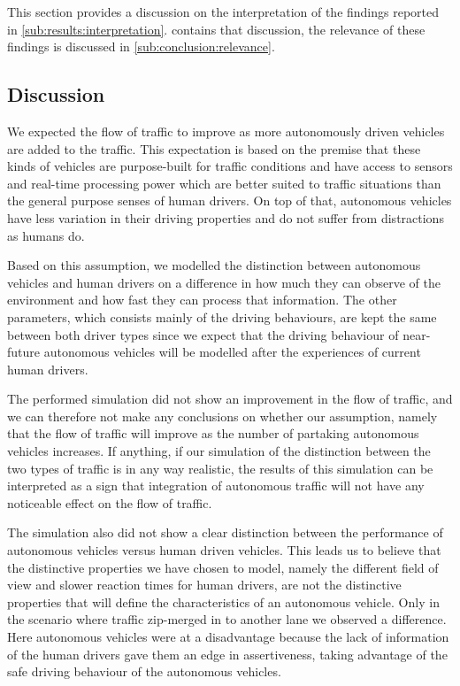 
This section provides a discussion on the interpretation of the findings reported in \cref{sub:results:interpretation}.  contains that discussion, the relevance of these findings is discussed in \cref{sub:conclusion:relevance}.

\subsection{Discussion}
\label{sub:conclusion:discussion}
We expected the flow of traffic to improve as more autonomously driven vehicles are added to the traffic. This expectation is based on the premise that these kinds of vehicles are purpose-built for traffic conditions and have access to sensors and real-time processing power which are better suited to traffic situations than the general purpose senses of human drivers. On top of that, autonomous vehicles have less variation in their driving properties and do not suffer from distractions as humans do.

Based on this assumption, we modelled the distinction between autonomous vehicles and human drivers on a difference in how much they can observe of the environment and how fast they can process that information. The other parameters, which consists mainly of the driving behaviours, are kept the same between both driver types since we expect that the driving behaviour of near-future autonomous vehicles will be modelled after the experiences of current human drivers.

The performed simulation did not show an improvement in the flow of traffic, and we can therefore not make any conclusions on whether our assumption, namely that the flow of traffic will improve as the number of partaking autonomous vehicles increases. If anything, if our simulation of the distinction between the two types of traffic is in any way realistic, the results of this simulation can be interpreted as a sign that integration of autonomous traffic will not have any noticeable effect on the flow of traffic.

The simulation also did not show a clear distinction between the performance of autonomous vehicles versus human driven vehicles. This leads us to believe that the distinctive properties we have chosen to model, namely the different field of view and slower reaction times for human drivers, are not the distinctive properties that will define the characteristics of an autonomous vehicle. Only in the scenario where traffic zip-merged in to another lane we observed a difference. Here autonomous vehicles were at a disadvantage because the lack of information of the human drivers gave them an edge in assertiveness, taking advantage of the safe driving behaviour of the autonomous vehicles.

